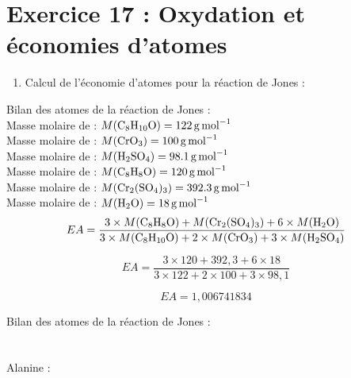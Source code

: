 \documentclass[a4paper,11pt,fleqn]{article}%
\begin{document}
	\maketitle
	\section*{Exercice 17 : Oxydation et économies d'atomes}
	\begin{enumerate}
		\item Calcul de l'économie d'atomes pour la réaction de Jones :
	\end{enumerate}
	Bilan des atomes de la réaction de Jones : \\
	Masse molaire de  : $M(\ce{C8H10O}) = \SI{122}{\gram\per\mole}$\\
	Masse molaire de  : $M(\ce{CrO3}) = \SI{100}{\gram\per\mole}$\\
	Masse molaire de  : $M(\ce{H2SO4}) = \SI{98,1}{\gram\per\mole}$\\
	Masse molaire de  : $M(\ce{C8H8O}) = \SI{120}{\gram\per\mole}$\\
	Masse molaire de  : $M(\ce{Cr2(SO4)3}) = \SI{392,3}{\gram\per\mole}$\\
	Masse molaire de  : $M(\ce{H2O}) = \SI{18}{\gram\per\mole}$
	$$ EA = \dfrac{3\times M(\ce{C8H8O}) + M(\ce{Cr2(SO4)3}) + 6\times M(\ce{H2O})}{3\times M(\ce{C8H10O}) + 2\times M(\ce{CrO3})+ 3 \times M(\ce{H2SO4})}$$

	$$ EA = \dfrac{3\times 120 + 392,3 + 6\times 18 }{3\times 122 + 2\times 100+ 3 \times 98,1}$$

	$$ EA = 1,006741834$$

	Bilan des atomes de la réaction de Jones : \\
	


	\\
	\\
	Alanine : 
	
	
\end{document}
